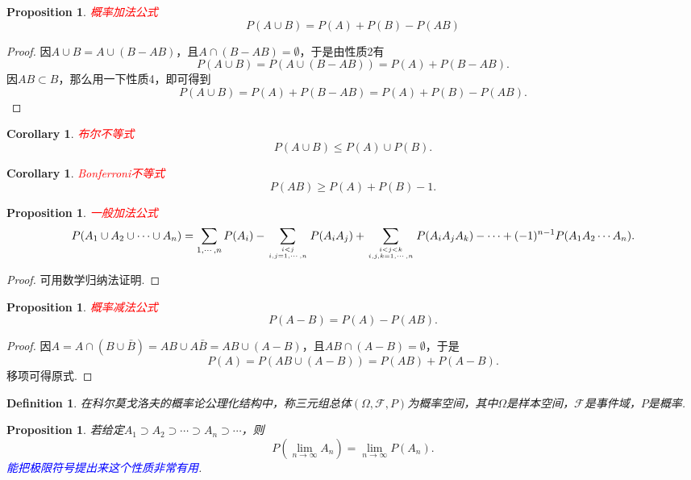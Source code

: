 \documentclass{article}
\newtheorem{corollary}[theorem]{Corollary}
\newtheorem{proposition}[theorem]{Proposition}
\newtheorem{definition}[theorem]{Definition}
\newcommand{\redt}[1]{\textcolor{red}{#1}}
\newcommand{\bluet}[1]{\textcolor{blue}{#1}}
\begin{document}
\begin{proposition}
\rm \redt{概率加法公式}
$$
P(A \cup B) = P(A) + P(B) - P(AB) 
$$
\end{proposition}

\begin{proof}
因$A \cup B = A \cup (B - AB)$，且$A \cap (B-AB) = \emptyset$，于是由性质2有
$$
P(A \cup B) = P(A \cup (B-AB)) = P(A) + P(B-AB).
$$
因$AB \subset B$，那么用一下性质4，即可得到
$$
P(A \cup B) = P(A) + P(B-AB) = P(A) + P(B) - P(AB).
$$
\end{proof}

\begin{corollary}
\rm \redt{布尔不等式}
$$
P(A \cup B) \leq P(A) \cup P(B).
$$
\end{corollary}

\begin{corollary}
\rm \redt{Bonferroni不等式}
$$
P(AB) \geq P(A) + P(B) -1.
$$
\end{corollary}

\begin{proposition}
\rm \redt{一般加法公式}
$$
P(A_1 \cup A_2 \cup \cdots \cup A_n) = \sum\limits_{1,\cdots,n} P(A_i) - \sum\limits_{i < j \atop i,j = 1,\cdots,n}P(A_iA_j) +  \sum\limits_{i < j < k \atop i,j,k = 1,\cdots,n}P(A_iA_jA_k) - \cdots + (-1)^{n-1}P(A_1A_2\cdots A_n). 
$$
\end{proposition}

\begin{proof}
可用数学归纳法证明. 
\end{proof}

\begin{proposition}
\rm \redt{概率减法公式} 
$$
P(A - B) = P(A) - P(AB).
$$
\end{proposition}

\begin{proof}
因$A = A\cap (B \cup \bar{B}) = AB \cup A\bar{B} = AB \cup (A-B)$，且$AB \cap (A-B) = \emptyset$，于是
$$
P(A) = P(AB \cup (A-B)) = P(AB) +
 P(A-B). 
$$
移项可得原式. 
\end{proof}

\begin{definition}
\rm 在科尔莫戈洛夫的概率论公理化结构中，称三元组总体$(\Omega,\mathscr{F}, P)$为{\color{red}概率空间}，其中$\Omega$是样本空间，$\mathscr{F}$是事件域，$P$是概率. 
\end{definition}


\begin{proposition}\label{probability-axiom: lemma1}
\rm 若给定$A_1 \supset A_2 \supset \cdots \supset A_n \supset \cdots$，则
$$
P(\lim\limits_{n \to \infty} A_n) = \lim\limits_{n \to \infty} P(A_n). 
$$
\bluet{能把极限符号提出来这个性质非常有用}. 
\end{proposition}
\end{document}
